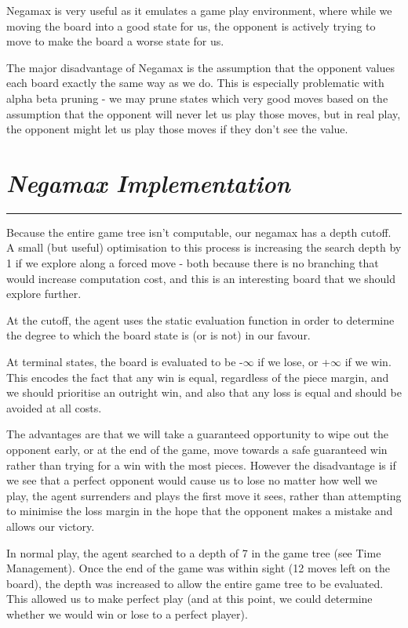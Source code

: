 \documentclass[10pt]{report}
\begin{document}
\begin{multicols}{2}
Negamax is very useful as it emulates a game play environment, where while we moving the board into a good state for us, the opponent is actively trying to move to make the board a worse state for us.

The major disadvantage of Negamax is the assumption that the opponent values each board exactly the same way as we do. This is especially problematic with alpha beta pruning - we may prune states which very good moves based on the assumption that the opponent will never let us play those moves, but in real play, the opponent might let us play those moves if they don't see the value.

\section*{\emph{\textmd{Negamax Implementation}}}
\hrule

Because the entire game tree isn't computable, our negamax has a depth cutoff. A small (but useful) optimisation to this process is increasing the search depth by 1 if we explore along a forced move - both because there is no branching that would increase computation cost, and this is an interesting board that we should explore further.

At the cutoff, the agent uses the static evaluation function in order to determine the degree to which the board state is (or is not) in our favour.

At terminal states, the board is evaluated to be -$\infty$ if we lose, or +$\infty$ if we win. This encodes the fact that any win is equal, regardless of the piece margin, and we should prioritise an outright win, and also that any loss is equal and should be avoided at all costs.

The advantages are that we will take a guaranteed opportunity to wipe out the opponent early, or at the end of the game, move towards a safe guaranteed win rather than trying for a win with the most pieces. However the disadvantage is if we see that a perfect opponent would cause us to lose no matter how well we play, the agent surrenders and plays the first move it sees, rather than attempting to minimise the loss margin in the hope that the opponent makes a mistake and allows our victory.

In normal play, the agent searched to a depth of 7 in the game tree (see Time Management). Once the end of the game was within sight (12 moves left on the board), the depth was increased to allow the entire game tree to be evaluated. This allowed us to make perfect play (and at this point, we could determine whether we would win or lose to a perfect player).


\end{multicols}
\end{document}

